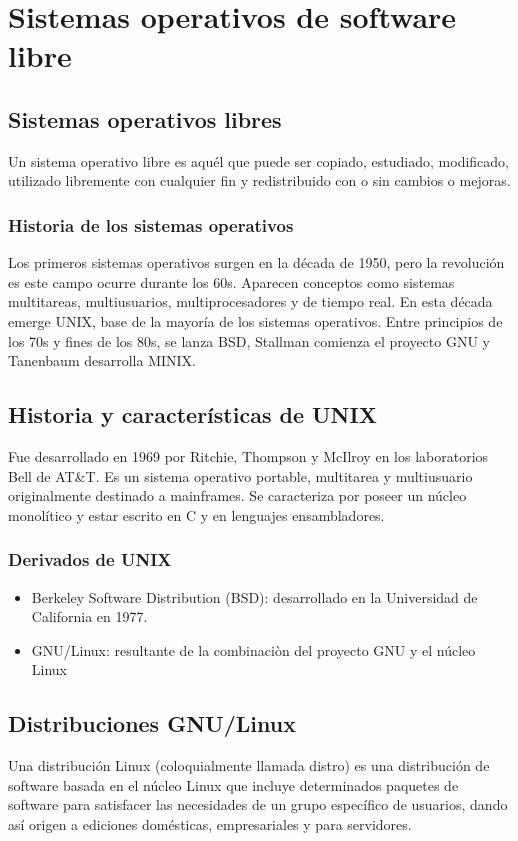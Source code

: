 \chapter{Sistemas operativos de software libre}

\section{Sistemas operativos libres}
Un sistema operativo libre es aquél que puede ser copiado, estudiado, modificado, utilizado libremente con cualquier fin y redistribuido con o sin cambios o mejoras.

\subsection{Historia de los sistemas operativos}
Los primeros sistemas operativos surgen en la década de 1950, pero la revolución es este campo ocurre durante los 60s.
Aparecen conceptos como sistemas multitareas, multiusuarios, multiprocesadores y de tiempo real. En esta década emerge UNIX, base de la mayoría de los sistemas operativos.
Entre principios de los 70s y fines de los 80s, se lanza BSD, Stallman comienza el proyecto GNU y Tanenbaum desarrolla MINIX.


\section{Historia y características de UNIX}
Fue desarrollado en 1969 por Ritchie, Thompson y McIlroy en los laboratorios Bell de AT\&T. Es un sistema operativo portable, multitarea y multiusuario originalmente destinado a mainframes.
Se caracteriza por poseer un núcleo monolítico y estar escrito en C y en lenguajes ensambladores.

\subsection{Derivados de UNIX}
\begin{itemize}
	\item Berkeley Software Distribution (BSD): desarrollado en la Universidad de California en 1977.
	\item GNU/Linux: resultante de la combinaciòn del proyecto GNU y el núcleo Linux
\end{itemize}

	
\section{Distribuciones GNU/Linux}
Una distribución Linux (coloquialmente llamada distro) es una distribución de software basada en el núcleo Linux que incluye determinados paquetes de software para satisfacer las necesidades de un grupo específico de usuarios, dando así origen a ediciones domésticas, empresariales y para servidores. 

